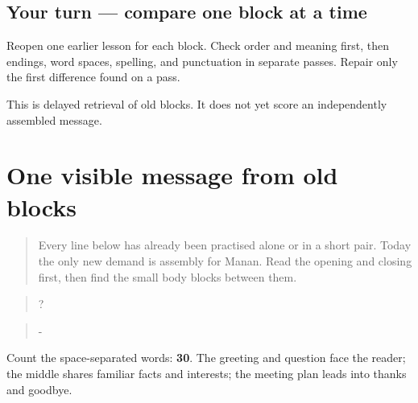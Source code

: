 \subsection*{Your turn — compare one block at a time}
Reopen one earlier lesson for each block. Check order and meaning first, then endings, word spaces, spelling, and punctuation in separate passes. Repair only the first difference found on a pass.

\begin{tcolorbox}[breakable,colback=teal!4,colframe=teal!35!black,title={Before you move on}]
This is delayed retrieval of old blocks. It does not yet score an independently assembled message.
\end{tcolorbox}
\section[\texorpdfstring{\pa{ਨਮਸਤੇ} \pa{ਮਨਨ।} · \pa{ਫਿਰ} … (supported …)}{ਨਮਸਤੇ ਮਨਨ। · ਫਿਰ … (supported …)}]{One visible message from old blocks}

\label{lesson:PA-W12-message-supported}



\begin{quote}
Every line below has already been practised alone or in a short pair. Today the only new demand is assembly for Manan. Read the opening and closing first, then find the small body blocks between them.
\end{quote}

\begin{tcolorbox}[breakable,skin=enhanced,colback=orange!6,colframe=orange!45!black,boxrule=0.5pt,arc=1mm,left=6pt,right=6pt,top=4pt,bottom=4pt,fonttitle=\bfseries,title={Read this}]
\begin{quote}
    ?
\end{quote}

\begin{quote}
         - 
\end{quote}

\begin{quote}
       
\end{quote}

\begin{quote}
     
\end{quote}

Count the space-separated words: \textbf{30}. The greeting and question face the reader; the middle shares familiar facts and interests; the meeting plan leads into thanks and goodbye.
\end{tcolorbox}

